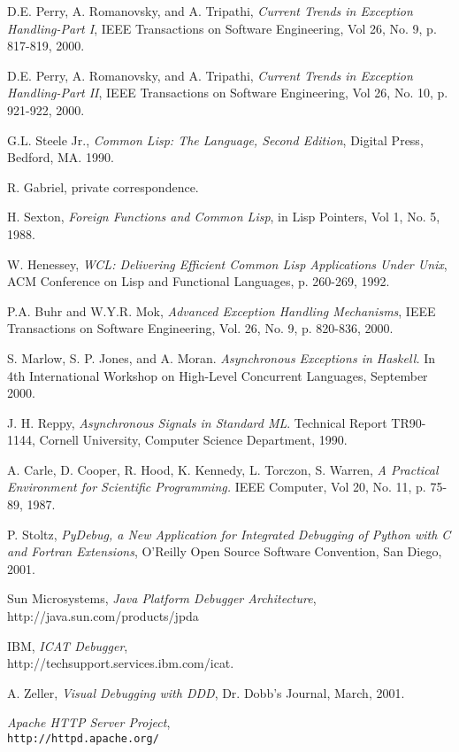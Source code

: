 \begin{thebibliography}{99}
 D.E. Perry, A. Romanovsky, and A. Tripathi, {\em
Current Trends in Exception Handling-Part I},
IEEE Transactions on Software Engineering, Vol 26, No. 9, p. 817-819, 2000.

 D.E. Perry, A. Romanovsky, and A. Tripathi, {\em
Current Trends in Exception Handling-Part II},
IEEE Transactions on Software Engineering, Vol 26, No. 10, p. 921-922, 2000.


 G.L. Steele Jr., {\em Common Lisp: The Language, Second Edition}, Digital Press,
Bedford, MA. 1990.

 R. Gabriel, private correspondence.

 H. Sexton, {\em Foreign Functions and Common Lisp}, in Lisp Pointers, Vol 1, No. 5, 1988.

 W. Henessey, {\em WCL: Delivering Efficient Common Lisp Applications Under Unix},
ACM Conference on Lisp and Functional Languages, p. 260-269, 1992.

 P.A. Buhr and W.Y.R. Mok, {\em Advanced Exception Handling Mechanisms}, IEEE Transactions on Software Engineering,
Vol. 26, No. 9, p. 820-836, 2000. 

 S. Marlow, S. P. Jones, and A. Moran. {\em
Asynchronous Exceptions in Haskell.} In 4th International Workshop on
High-Level Concurrent Languages, September 2000.

 J. H. Reppy, {\em Asynchronous Signals in Standard ML}. Technical Report TR90-1144,
Cornell University, Computer Science Department, 1990.

 A. Carle, D. Cooper, R. Hood, K. Kennedy, L. Torczon, S. Warren, 
{\em A Practical Environment for Scientific Programming.}
IEEE Computer, Vol 20, No. 11, p. 75-89, 1987.

 P. Stoltz, {\em PyDebug, a New Application for Integrated
Debugging of Python with C and Fortran Extensions}, O'Reilly Open Source Software Convention,
San Diego, 2001.

 Sun Microsystems, {\em Java Platform Debugger Architecture}, 
http://java.sun.com/products/jpda

 IBM, {\em ICAT Debugger}, \\
http://techsupport.services.ibm.com/icat.

 A. Zeller, {\em Visual Debugging with DDD}, Dr. Dobb's Journal, March, 2001.

 {\em Apache HTTP Server Project}, \\
{\tt http://httpd.apache.org/}

\end{thebibliography}











